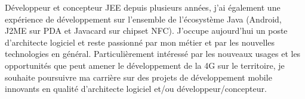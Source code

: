 %
%
%
\par{
Développeur et concepteur JEE depuis plusieurs années, j'ai également une expérience de développement sur l'ensemble de l'écosystème Java (Android, J2ME sur PDA et Javacard sur chipset NFC). J'occupe aujourd'hui un poste d'architecte logiciel et reste passionné par mon métier et par les nouvelles technologies en général. Particulièrement intéressé par les nouveaux usages  et les opportunités que peut amener le développement de la 4G sur le territoire, je souhaite poursuivre ma carrière sur des projets de développement mobile innovants en qualité d'architecte logiciel et/ou développeur/concepteur.
}